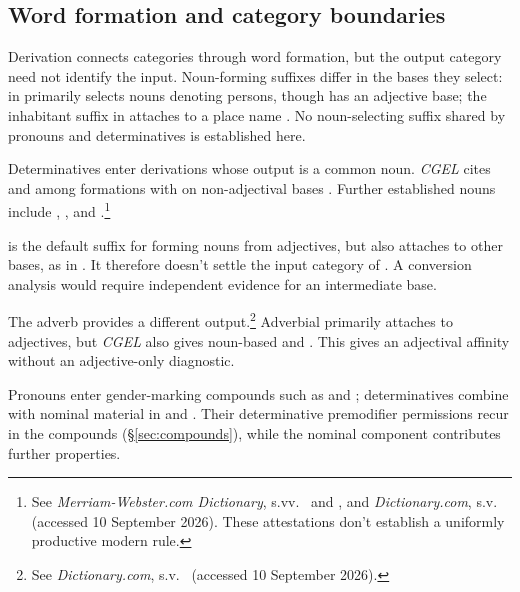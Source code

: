 \documentclass[12pt]{article}
\begin{document}
\subsection{Word formation and category boundaries}\label{sec:word-formation}

Derivation connects categories through word formation, but the output category need not identify the input. Noun-forming suffixes differ in the bases they select:  in  primarily selects nouns denoting persons, though  has an adjective base; the inhabitant suffix  in  attaches to a place name \citep[Ch.~19, §§5.6.2(b), 5.7.2(k)]{huddleston2002}. No noun-selecting suffix shared by pronouns and determinatives is established here.

Determinatives enter derivations whose output is a common noun. \textit{CGEL} cites  and  among formations with  on non-adjectival bases \citep[Ch.~19, §5.7.2(i)]{huddleston2002}. Further established nouns include , , and .\footnote{See \textit{Merriam-Webster.com Dictionary}, s.vv.\ \href{https://www.merriam-webster.com/dictionary/thisness}{} and \href{https://www.merriam-webster.com/dictionary/fewness}{}, and \textit{Dictionary.com}, s.v.\ \href{https://www.dictionary.com/browse/muchness}{} (accessed 10 September 2026). These attestations don't establish a uniformly productive modern rule.}

 is the default suffix for forming nouns from adjectives, but also attaches to other bases, as in  \citep[Ch.~19, §5.7.2(i)]{huddleston2002}. It therefore doesn't settle the input category of . A conversion analysis would require independent evidence for an intermediate base.

The adverb  provides a different output.\footnote{See \textit{Dictionary.com}, s.v.\ \href{https://www.dictionary.com/browse/mostly}{} (accessed 10 September 2026).} Adverbial  primarily attaches to adjectives, but \textit{CGEL} also gives noun-based  and  \citep[566]{huddleston2002}. This gives  an adjectival affinity without an adjective-only diagnostic.

Pronouns enter gender-marking compounds such as  and  \citep[Ch.~19, §5.3]{huddleston2002}; determinatives combine with nominal material in  and . Their determinative premodifier permissions recur in the compounds (§\ref{sec:compounds}), while the nominal component contributes further properties.
\end{document}
